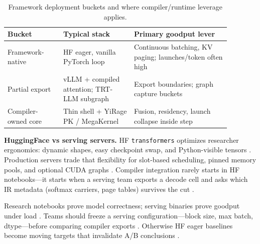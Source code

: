 \begin{table}[t]
\centering
\caption{Framework deployment buckets and where compiler/runtime leverage applies.}
\label{tab:ch28_framework_buckets}
\begin{tabular}{@{}p{0.22\linewidth}p{0.28\linewidth}p{0.38\linewidth}@{}}
\toprule
\textbf{Bucket} & \textbf{Typical stack} & \textbf{Primary goodput lever} \\
\midrule
Framework-native & HF eager, vanilla PyTorch loop & Continuous batching, KV paging; launches/token often high \citep{taxbreak2026,kwon2023vllm} \\
Partial export & vLLM + compiled attention; TRT-LLM subgraph & Export boundaries; graph capture buckets \citep{nvidia2024cudagraphs,patel2025llminference} \\
Compiler-owned core & Thin shell + YiRage PK / MegaKernel & Fusion, residency, launch collapse inside step \citep{yirage2026,chen2020compilerbasedhardw} \\
\bottomrule
\end{tabular}
\end{table}

\textbf{HuggingFace vs serving servers.} HF \texttt{transformers} optimizes researcher ergonomics: dynamic shapes, easy checkpoint swap, and Python-visible tensors \citep{patel2025llminference,dlbook}. Production servers trade that flexibility for slot-based scheduling, pinned memory pools, and optional CUDA graphs \citep{kwon2023vllm,nvidia2024cudagraphs,memoryfloor2026}. Compiler integration rarely starts in HF notebooks---it starts when a serving team exports a decode cell and asks which IR metadata (softmax carriers, page tables) survives the cut \citep{dao2022flashattention,yirage2026,chen2020compilerbasedhardw,nvidia2024cudagraphs}.

Research notebooks prove model correctness; serving binaries prove goodput under load \citep{patel2025llminference,dlbook,kwon2023vllm,taxbreak2026,memoryfloor2026,yirage2026,chen2020compilerbasedhardw,dao2022flashattention,liu2024deepseekv3,nvidia2024cudagraphs,semianalysis2024tma,amd2024xdna,amd2024aie,dao2023flashdecoding,nvidia2022hopper,dlbook}. Teams should freeze a serving configuration---block size, max batch, dtype---before comparing compiler exports \citep{kwon2023vllm,patel2025llminference,memoryfloor2026,taxbreak2026,yirage2026,chen2020compilerbasedhardw,dlbook,nvidia2024cudagraphs,dao2022flashattention,liu2024deepseekv3,semianalysis2024tma,amd2024aie,amd2024xdna,dao2023flashdecoding,nvidia2022hopper,dlbook}. Otherwise HF eager baselines become moving targets that invalidate A/B conclusions \citep{patel2025llminference,taxbreak2026,memoryfloor2026,yirage2026,chen2020compilerbasedhardw,kwon2023vllm,dlbook}.

